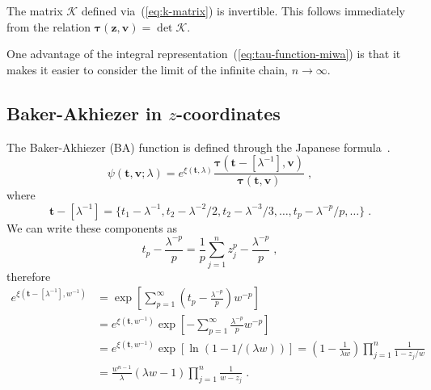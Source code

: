 \documentclass[a4paper,12pt]{amsart}
\begin{document}
\begin{lemma}
\label{lemma:k-invert}
The matrix \(\bm{\mathcal{K}}\) defined via~(\ref{eq:k-matrix}) is
invertible. This follows immediately from the relation
\(\bm{\tau}(\bm{z}, \bm{v}) = \det \bm{\mathcal{K}}\).
\end{lemma}

One advantage of the integral
representation~(\ref{eq:tau-function-miwa}) is that it makes it easier
to consider the limit of the infinite chain, \(n\to \infty\).


\subsection{Baker-Akhiezer  in \(z\)-coordinates}

The Baker-Akhiezer (BA) function is defined through the
Japanese formula~\cite{Babelon:2003qtg, Harnad:2021tau, Zabrodin2018}.
\begin{equation}
\label{eq:ba-function}
  \psi(\bm{t},\bm{v}; \lambda) = e^{\xi(\bm{t}, \lambda)}
  \frac{\bm{\tau}(\bm{t} - [\lambda^{-1}], \bm{v})}{\bm{\tau}(\bm{t}, \bm{v})}\; ,
\end{equation}
where 
\begin{equation}
  \bm{t} - [\lambda^{-1}] = 
  \{t_1 - \lambda^{-1}, t_2 - \lambda^{-2}/ 2 ,  t_2 - \lambda^{-3}/3, \dots,  t_p - \lambda^{-p}/p, \dots \}\; .
\end{equation}
We can write these components as
\begin{equation}
  t_p - \frac{\lambda^{-p}}{p} = \frac{1}{p} \sum_{j=1}^n z_j^ p - \frac{\lambda^{-p}}{p} \; , 
\end{equation}
therefore
\begin{equation}
  \begin{split}
    e^{\xi(\bm{t} - [\lambda^{-1}], w^{-1})} & = \exp\left[ \sum_{p=1}^\infty \left(t_p  - \frac{\lambda^{-p}}{p}\right) w^{-p} \right]\\
    & = e^{\xi(\bm{t}, w^{-1})} \exp\left[ - \sum_{p=1}^\infty \frac{\lambda^{-p}}{p} w^{-p} \right] \\
    & = e^{\xi(\bm{t}, w^{-1})} \exp\left[ \ln ( 1 - 1 / (\lambda w)) \right]
      = \left( 1 - \frac{1}{\lambda w}\right)  \prod_{j=1}^n \frac{1}{1 -  z_j /w} \\
    & = \frac{w^{n-1}}{\lambda } \left( \lambda w - 1 \right)  \prod_{j=1}^n \frac{1}{w -  z_j} \; .
  \end{split}
\end{equation}
\end{document}
